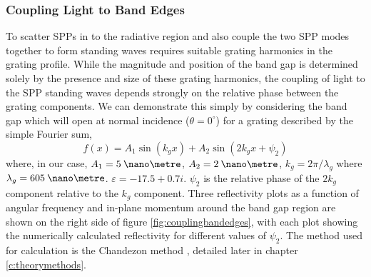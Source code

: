 \subsubsection{Coupling Light to Band Edges}
To scatter SPPs in to the radiative region and also couple the two SPP modes together to form standing waves requires suitable grating harmonics in the grating profile.  While the magnitude and position of the band gap is determined solely by the presence and size of these grating harmonics, the coupling of light to the SPP standing waves depends strongly on the relative phase between the grating components. We can demonstrate this simply by considering the band gap which will open at normal incidence ($\theta=0^\circ$) for  a grating described by the simple Fourier sum,
\begin{equation*}
f(x)=A_1\sin(k_g x)+A_2\sin(2k_g x + \psi_2)
\end{equation*}
where, in our case, $A_1=5\:\nano\metre$, $A_2=2\:\nano\metre$, $k_g=2\pi/\lambda_g$ where $\lambda_g=605\:\nano\metre$. $\varepsilon = -17.5 + 0.7i $. $\psi_2$ is the relative phase of the $2k_g$ component relative to the $k_g$  component. Three reflectivity plots as a function of angular frequency and in-plane momentum around the band gap  region are shown on the right side of figure \ref{fig:couplingbandedges}, with each plot showing the numerically calculated reflectivity for different values of $\psi_2$. The method used for calculation is the Chandezon method \cite{Chandezon1980,Li1999}, detailed later in chapter \ref{c:theorymethods}.
